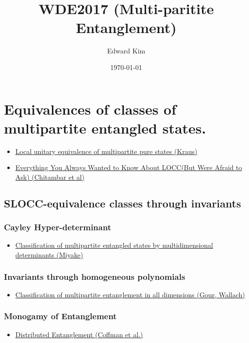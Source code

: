 \documentclass[11pt]{article}
\author{Edward Kim}
\date{\today}
\title{WDE2017 (Multi-paritite Entanglement)}
\begin{document}
\maketitle
\tableofcontents


\section{Equivalences of classes of multipartite entangled states.}
\label{sec:org289b808}
\begin{itemize}
\item \href{https://arxiv.org/pdf/0909.5152.pdf}{Local unitary equivalence of multipartite pure states (Kraus)}
\item \href{https://arxiv.org/pdf/1210.4583.pdf}{Everything You Always Wanted to Know About LOCC(But Were Afraid to Ask) (Chitambar et al)}
\end{itemize}

\subsection{SLOCC-equivalence classes through invariants}
\label{sec:org6ca10d4}
\subsubsection{Cayley Hyper-determinant}
\label{sec:org7e31bcb}
\begin{itemize}
\item \href{https://arxiv.org/pdf/quant-ph/0206111.pdf}{Classification of multipartite entangled states by multidimensional determinants (Miyake)}
\end{itemize}
\subsubsection{Invariants through homogeneous polynomials}
\label{sec:org0d4c8a7}
\begin{itemize}
\item \href{https://arxiv.org/pdf/1304.7259.pdf}{Classification of multipartite entanglement in all dimensions (Gour, Wallach)}
\end{itemize}
\subsubsection{Monogamy of Entanglement}
\label{sec:org6ff7435}
\begin{itemize}
\item \href{https://arxiv.org/pdf/quant-ph/9907047.pdf}{Distributed Entanglement (Coffman et al.)}
\end{itemize}
\end{document}
